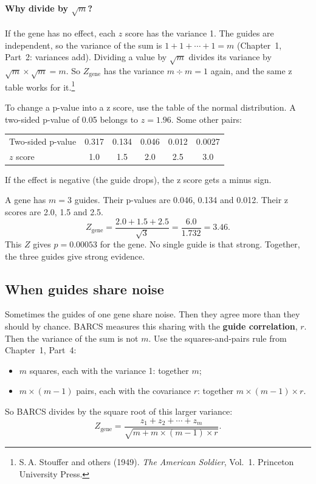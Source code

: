 \paragraph{Why divide by $\sqrt{m}$?} If the gene has no effect, each $z$
score has the variance 1. The guides are independent, so the variance of the
sum is $1 + 1 + \cdots + 1 = m$ (Chapter~1, Part~2: variances add).
Dividing a value by $\sqrt{m}$ divides its variance by
$\sqrt{m} \times \sqrt{m} = m$. So $Z_{\text{gene}}$ has the variance
$m \div m = 1$ again, and the same z table works for it.\footnote{S.\,A.
Stouffer and others (1949). \emph{The American Soldier}, Vol.~1. Princeton
University Press.}

To change a p-value into a z score, use the table of the normal
distribution. A two-sided p-value of 0.05 belongs to $z = 1.96$. Some
other pairs:

\begin{center}
\begin{tabular}{lccccc}
\toprule
Two-sided p-value & 0.317 & 0.134 & 0.046 & 0.012 & 0.0027\\
$z$ score & 1.0 & 1.5 & 2.0 & 2.5 & 3.0\\
\bottomrule
\end{tabular}
\end{center}

If the effect is negative (the guide drops), the z score gets a minus sign.

\begin{worked}
A gene has $m = 3$ guides. Their p-values are 0.046, 0.134 and 0.012. Their
z scores are 2.0, 1.5 and 2.5.
\[
Z_{\text{gene}} = \frac{2.0 + 1.5 + 2.5}{\sqrt{3}} = \frac{6.0}{1.732}
 = 3.46.
\]
This $Z$ gives $p = 0.00053$ for the gene. No single guide is that strong.
Together, the three guides give strong evidence.
\end{worked}

\subsection{When guides share noise}

Sometimes the guides of one gene share noise. Then they agree more than
they should by chance. BARCS measures this sharing with the
\textbf{guide correlation}, $r$. Then the variance of the sum is not $m$.
Use the squares-and-pairs rule from Chapter~1, Part~4:
\begin{itemize}
\item $m$ squares, each with the variance 1: together $m$;
\item $m \times (m-1)$ pairs, each with the covariance $r$: together
  $m \times (m-1) \times r$.
\end{itemize}
So BARCS divides by the square root of this larger variance:
\[
Z_{\text{gene}} = \frac{z_1 + z_2 + \cdots + z_m}{\sqrt{m + m \times (m-1) \times r}}.
\]

